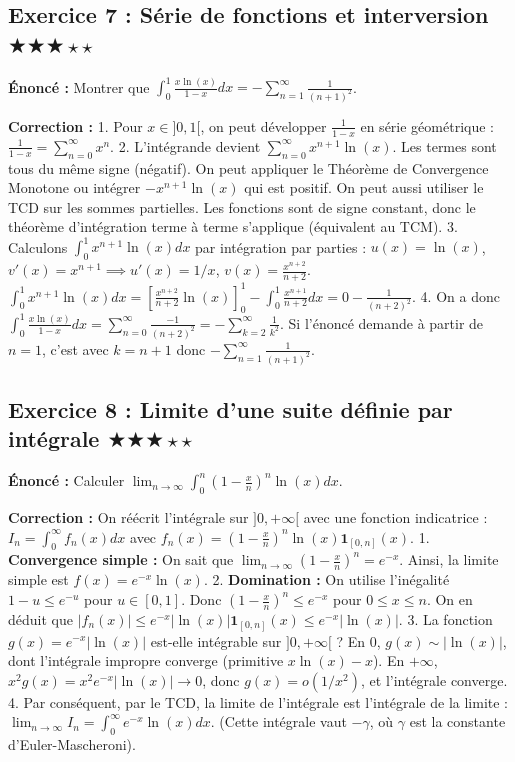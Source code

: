 \documentclass[11pt,a4paper]{article}
\begin{document}
\subsection*{Exercice 7 : Série de fonctions et interversion \quad $\bigstar\bigstar\bigstar\star\star$}

\textbf{Énoncé :}
Montrer que $\int_0^1 \frac{x \ln(x)}{1-x} dx = -\sum_{n=1}^{\infty} \frac{1}{(n+1)^2}$.

\textbf{Correction :}
1. Pour $x \in ]0, 1[$, on peut développer $\frac{1}{1-x}$ en série géométrique : $\frac{1}{1-x} = \sum_{n=0}^{\infty} x^n$.
2. L'intégrande devient $\sum_{n=0}^{\infty} x^{n+1} \ln(x)$. Les termes sont tous du même signe (négatif). On peut appliquer le Théorème de Convergence Monotone ou intégrer $-x^{n+1}\ln(x)$ qui est positif.
On peut aussi utiliser le TCD sur les sommes partielles. Les fonctions sont de signe constant, donc le théorème d'intégration terme à terme s'applique (équivalent au TCM).
3. Calculons $\int_0^1 x^{n+1} \ln(x) dx$ par intégration par parties :
   $u(x) = \ln(x)$, $v'(x) = x^{n+1} \implies u'(x) = 1/x$, $v(x) = \frac{x^{n+2}}{n+2}$.
   $\int_0^1 x^{n+1} \ln(x) dx = \left[ \frac{x^{n+2}}{n+2} \ln(x) \right]_0^1 - \int_0^1 \frac{x^{n+1}}{n+2} dx = 0 - \frac{1}{(n+2)^2}$.
4. On a donc $\int_0^1 \frac{x \ln(x)}{1-x} dx = \sum_{n=0}^{\infty} \frac{-1}{(n+2)^2} = -\sum_{k=2}^{\infty} \frac{1}{k^2}$.
Si l'énoncé demande à partir de $n=1$, c'est avec $k=n+1$ donc $-\sum_{n=1}^{\infty} \frac{1}{(n+1)^2}$.


\subsection*{Exercice 8 : Limite d'une suite définie par intégrale \quad $\bigstar\bigstar\bigstar\star\star$}

\textbf{Énoncé :}
Calculer $\lim_{n \to \infty} \int_0^n \left(1 - \frac{x}{n}\right)^n \ln(x) dx$.

\textbf{Correction :}
On réécrit l'intégrale sur $]0, +\infty[$ avec une fonction indicatrice :
$I_n = \int_0^\infty f_n(x) dx$ avec $f_n(x) = \left(1 - \frac{x}{n}\right)^n \ln(x) \mathbf{1}_{[0, n]}(x)$.
1. \textbf{Convergence simple :} On sait que $\lim_{n \to \infty} \left(1 - \frac{x}{n}\right)^n = e^{-x}$. Ainsi, la limite simple est $f(x) = e^{-x} \ln(x)$.
2. \textbf{Domination :} On utilise l'inégalité $1 - u \le e^{-u}$ pour $u \in [0, 1]$.
   Donc $\left(1 - \frac{x}{n}\right)^n \le e^{-x}$ pour $0 \le x \le n$.
   On en déduit que $|f_n(x)| \le e^{-x} |\ln(x)| \mathbf{1}_{[0, n]}(x) \le e^{-x} |\ln(x)|$.
3. La fonction $g(x) = e^{-x} |\ln(x)|$ est-elle intégrable sur $]0, +\infty[$ ?
   En 0, $g(x) \sim |\ln(x)|$, dont l'intégrale impropre converge (primitive $x \ln(x) - x$).
   En $+\infty$, $x^2 g(x) = x^2 e^{-x} |\ln(x)| \to 0$, donc $g(x) = o(1/x^2)$, et l'intégrale converge.
4. Par conséquent, par le TCD, la limite de l'intégrale est l'intégrale de la limite :
   $\lim_{n \to \infty} I_n = \int_0^\infty e^{-x} \ln(x) dx$. (Cette intégrale vaut $-\gamma$, où $\gamma$ est la constante d'Euler-Mascheroni).
\end{document}
